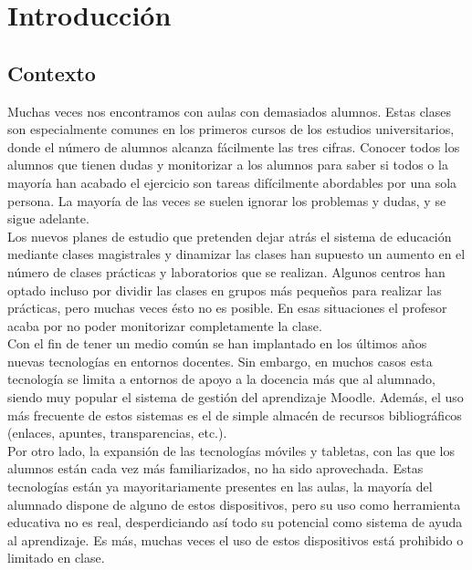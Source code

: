 
\pagestyle{fancy}

\chapter{Introducción}
\label{introduccion}

\section{Contexto}

Muchas veces nos encontramos con aulas con demasiados alumnos. Estas clases son especialmente comunes en los primeros cursos de los estudios universitarios, donde el número de alumnos alcanza fácilmente las tres cifras. Conocer todos los alumnos que tienen dudas y monitorizar a los alumnos para saber si todos o la mayoría han acabado el ejercicio son tareas difícilmente abordables por una sola persona. La mayoría de las veces se suelen ignorar los problemas y dudas, y se sigue adelante.\\

Los nuevos planes de estudio que pretenden dejar atrás el sistema de educación mediante clases magistrales y dinamizar las clases han supuesto un aumento en el número de clases prácticas y laboratorios que se realizan. Algunos centros han optado incluso por dividir las clases en grupos más pequeños para realizar las prácticas, pero muchas veces ésto no es posible. En esas situaciones el profesor acaba por no poder monitorizar completamente la clase.\\

Con el fin de tener un medio común se han implantado en los últimos años nuevas tecnologías en entornos docentes. Sin embargo, en muchos casos esta tecnología se limita a entornos de apoyo a la docencia más que al alumnado, siendo muy popular el sistema de gestión del aprendizaje Moodle. Además, el uso más frecuente de estos sistemas es el de simple almacén de recursos bibliográficos (enlaces, apuntes, transparencias, etc.).\\

Por otro lado, la expansión de las tecnologías móviles y tabletas, con las que los alumnos están cada vez más familiarizados, no ha sido aprovechada. Estas tecnologías están ya mayoritariamente presentes en las aulas, la mayoría del alumnado dispone de alguno de estos dispositivos, pero su uso como herramienta educativa no es real, desperdiciando así todo su potencial como sistema de ayuda al aprendizaje. Es más, muchas veces el uso de estos dispositivos está prohibido o limitado en clase.\\

